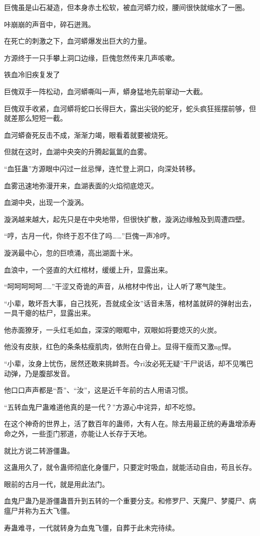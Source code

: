 \begin{this_body}
巨傀虽是山石凝造，但本身赤土松软，被血河蟒力绞，腰间很快就缩水了一圈。

咔崩崩的声音中，碎石迸溅。

在死亡的刺激之下，血河蟒爆发出巨大的力量。

方源终于一只手攀上洞口边缘，巨傀忽然传来几声咳嗽。

铁血冷旧疾复发了

巨傀双手一阵松动，血河蟒嘶叫一声，蟒身猛地先前窜动一大截。

巨傀双手收紧，血河蟒将蛇口长得巨大，露出尖锐的蛇牙，蛇头疯狂摇摆前够，但就差那么短短一截。

血河蟒奋死反击不成，渐渐力竭，眼看着就要被烧死。

但就在这时，血湖中央突的升腾起氤氲的血雾。

“血狂蛊”方源眼中闪过一丝忌惮，连忙登上洞口，向深处转移。

血雾迅速地弥漫开来，血湖表面的火焰彻底熄灭。

血湖中央，出现一个漩涡。

漩涡越来越大，起先只是在中央地带，但很快扩散，漩涡边缘触及到周遭四壁。

“哼，古月一代，你终于忍不住了吗……”巨傀一声冷哼。

漩涡最中心，忽的巨喷涌，高出湖面十米。

血浪中，一个竖直的大红棺材，缓缓上升，显露出来。

“呵呵呵呵呵……”干涩又奇诡的声音，从棺材中传出，让人听了寒气陡生。

“小辈，敢坏吾大事，自己找死，吾就成全汝”话音未落，棺材盖就砰的弹射出去，一具干瘪的枯尸，显露出来。

他赤面獠牙，一头红毛如血，深深的眼眶中，双眼如将要熄灭的火炭。

他没有皮肤，红色的条条枯瘦肌肉，依附在白骨上。显得干瘦而又激ng悍。

“小辈，汝身上忧伤，居然还敢来挑衅吾。今ri汝必死无疑”干尸说话，却不见嘴巴动弹，乃是腹部发音。

他口口声声都是“吾”、“汝”，这是近千年前的古人用语习惯。

“五转血鬼尸蛊难道他真的是一代？”方源心中诧异，却不吃惊。

在这个神奇的世界上，活了数百年的蛊师，大有人在。除去用最正统的寿蛊增添寿命之外，一些歪门邪道，亦能让人长存于天地。

就比方说二转游僵蛊。

这蛊用久了，就令蛊师彻底化身僵尸，只要定时吸血，就能活动自由，苟且长存。

眼前的古月一代，就是用此法门。

血鬼尸蛊乃是游僵蛊晋升到五转的一个重要分支。和修罗尸、天魔尸、梦魇尸、病瘟尸并称为五大飞僵。

寿蛊难寻，一代就转身为血鬼飞僵，自葬于此未完待续。

\end{this_body}

